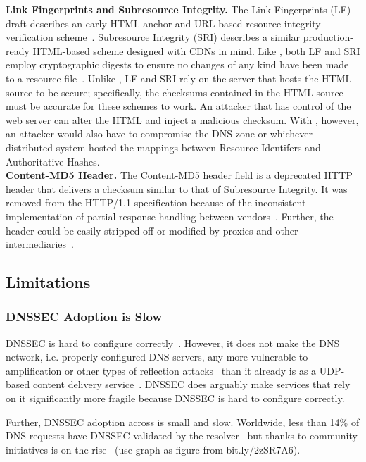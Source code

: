 \noindent\textbf{Link Fingerprints and Subresource Integrity.} The Link
Fingerprints (LF) draft describes an early HTML anchor and URL based resource
integrity verification scheme~\cite{LF}. Subresource Integrity (SRI) describes a
similar production-ready HTML-based scheme designed with CDNs in mind. Like
\SYSTEM{}, both LF and SRI employ cryptographic digests to ensure no changes of
any kind have been made to a resource file~\cite{SRI}. Unlike \SYSTEM{}, LF and
SRI rely on the server that hosts the HTML source to be secure; specifically,
the checksums contained in the HTML source must be accurate for these schemes to
work. An attacker that has control of the web server can alter the HTML and
inject a malicious checksum. With \SYSTEM{}, however, an attacker would also
have to compromise the DNS zone or whichever distributed system hosted the
mappings between Resource Identifers and Authoritative Hashes. \\

\noindent\textbf{Content-MD5 Header.} The Content-MD5 header field is a
deprecated HTTP header that delivers a checksum similar to that of Subresource
Integrity. It was removed from the HTTP/1.1 specification because of the
inconsistent implementation of partial response handling between
vendors~\cite{HTTP1.1}. Further, the header could be easily stripped off or
modified by proxies and other intermediaries~\cite{MD5Header}.

\subsection{Limitations}

\subsubsection{DNSSEC Adoption is Slow}

DNSSEC is hard to configure correctly~\cite{DNSSEC-is-hard-1, DNSSEC-is-hard-2,
DNSSEC-is-hard-3, DNSSEC-is-hard-4}. However, it does not make the DNS network,
i.e. properly configured DNS servers, any more vulnerable to amplification or
other types of reflection attacks~\cite{Ariya} than it already is as a UDP-based
content delivery service~\cite{USCERT, Vixie}. DNSSEC does arguably make
services that rely on it significantly more fragile because DNSSEC is hard to
configure correctly.

Further, DNSSEC adoption across is small and slow. Worldwide, less than 14\% of
DNS requests have DNSSEC validated by the resolver~\cite{APNIC} but thanks to
community initiatives is on the rise~\cite{Cloudflare} (use graph as figure from
bit.ly/2zSR7A6).

